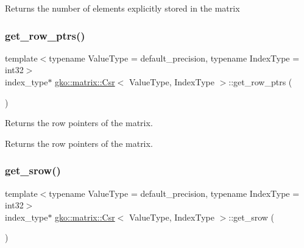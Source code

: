 \begin{DoxyReturn}{Returns}
the number of elements explicitly stored in the matrix 
\end{DoxyReturn}
\mbox{\label{classgko_1_1matrix_1_1Csr_a068e5158cf282fa977f0a137f8cd7f03}} 
\subsubsection{\texorpdfstring{get\+\_\+row\+\_\+ptrs()}{get\_row\_ptrs()}}
{\footnotesize\ttfamily template$<$typename Value\+Type = default\+\_\+precision, typename Index\+Type = int32$>$ \\
index\+\_\+type$\ast$ \hyperlink{classgko_1_1matrix_1_1Csr}{gko\+::matrix\+::\+Csr}$<$ Value\+Type, Index\+Type $>$\+::get\+\_\+row\+\_\+ptrs (\begin{DoxyParamCaption}{ }\end{DoxyParamCaption})\hspace{0.3cm}{\ttfamily [noexcept]}}



Returns the row pointers of the matrix. 

\begin{DoxyReturn}{Returns}
the row pointers of the matrix. 
\end{DoxyReturn}
\mbox{\label{classgko_1_1matrix_1_1Csr_a919fb1efdcbde6fba7eb18bdc39ba46a}} 
\subsubsection{\texorpdfstring{get\+\_\+srow()}{get\_srow()}}
{\footnotesize\ttfamily template$<$typename Value\+Type = default\+\_\+precision, typename Index\+Type = int32$>$ \\
index\+\_\+type$\ast$ \hyperlink{classgko_1_1matrix_1_1Csr}{gko\+::matrix\+::\+Csr}$<$ Value\+Type, Index\+Type $>$\+::get\+\_\+srow (\begin{DoxyParamCaption}{ }\end{DoxyParamCaption})\hspace{0.3cm}{\ttfamily [noexcept]}}



